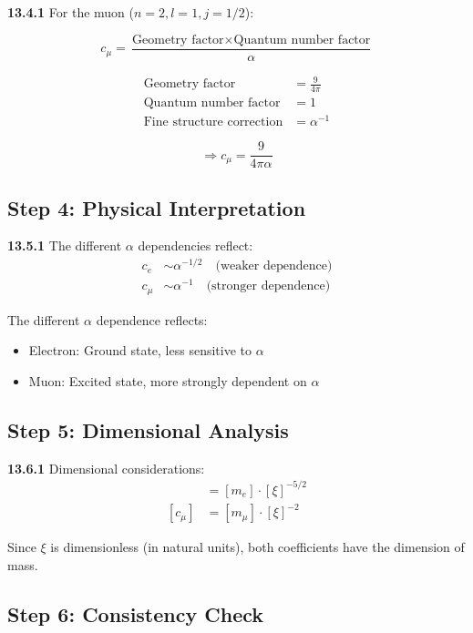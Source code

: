 \documentclass[12pt,a4paper]{article}
\begin{document}
\noindent \textbf{13.4.1} For the muon ($n=2, l=1, j=1/2$):

\[
c_\mu = \frac{\text{Geometry factor} \times \text{Quantum number factor}}{\alpha}
\]

\begin{align*}
	\text{Geometry factor} &= \frac{9}{4\pi} \\
	\text{Quantum number factor} &= 1 \\
	\text{Fine structure correction} &= \alpha^{-1}
\end{align*}

\[
\Rightarrow c_\mu = \frac{9}{4\pi\alpha}
\]

\subsection{Step 4: Physical Interpretation}

\noindent \textbf{13.5.1} The different $\alpha$ dependencies reflect:
\begin{align*}
	c_e &\sim \alpha^{-1/2} \quad \text{(weaker dependence)} \\
	c_\mu &\sim \alpha^{-1} \quad \text{(stronger dependence)}
\end{align*}

The different $\alpha$ dependence reflects:
\begin{itemize}
	\item Electron: Ground state, less sensitive to $\alpha$
	\item Muon: Excited state, more strongly dependent on $\alpha$
\end{itemize}

\subsection{Step 5: Dimensional Analysis}

\noindent \textbf{13.6.1} Dimensional considerations:
\begin{align*}
	[c_e] &= [m_e] \cdot [\xi]^{-5/2} \\
	[c_\mu] &= [m_\mu] \cdot [\xi]^{-2}
\end{align*}

Since $\xi$ is dimensionless (in natural units), both coefficients have the dimension of mass.

\subsection{Step 6: Consistency Check}
\end{document}
